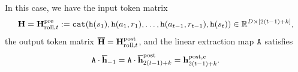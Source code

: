 In this case, we have the input token matrix  $${\mathbf H}={\mathbf H}^{\mathrm{pre}}_{{\mathrm{roll}},t}: = {\tt cat}({\tt h}({s}_1), {\tt h}({a}_1, {r}_1), \ldots, {\tt h}({a}_{t-1}, {r}_{t-1}), {\tt h}({s}_t)) \in \mathbb{R}^{D \times [2(t-1)+k]},$$ the output token matrix $\overline{{\mathbf H}}={\mathbf H}^{\mathrm{post}}_{{\mathrm{roll}},t}$, and the linear extraction map ${\tt A}$  satisfies $${\tt A}\cdot\overline{{\mathbf h}}_{-1}={\tt A}\cdot\overline{{\mathbf h}}^{\mathrm{post}}_{2(t-1)+k}={\mathbf h}^{{\mathrm{post}},{c}}_{2(t-1)+k}.$$ 





















